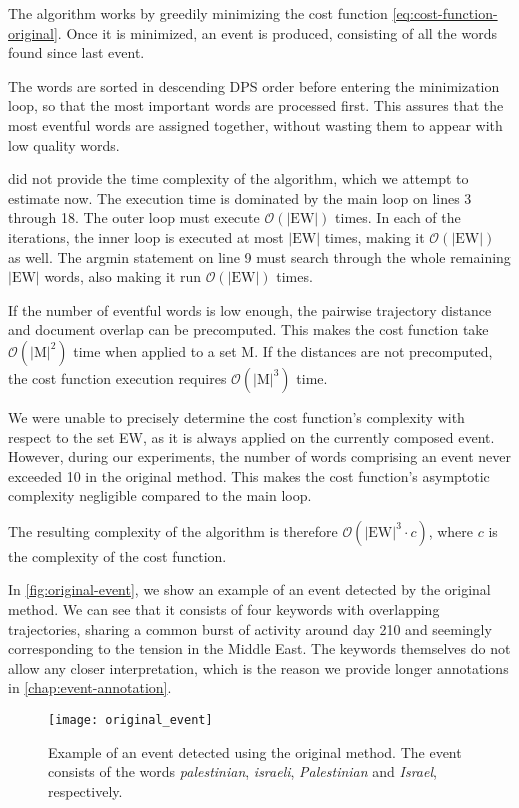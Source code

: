 The algorithm works by greedily minimizing the cost function \eqref{eq:cost-function-original}. Once it is minimized, an event is produced, consisting of all the words found since last event.

The words are sorted in descending DPS order before entering the minimization loop, so that the most important words are processed first. This assures that the most eventful words are assigned together, without wasting them to appear with low quality words.

\cite{event-detection} did not provide the time complexity of the algorithm, which we attempt to estimate now. The execution time is dominated by the main loop on lines 3 through 18. The outer loop must execute $\mathcal{O}(|\text{EW}|)$ times. In each of the iterations, the inner loop is executed at most $|\text{EW}|$ times, making it $\mathcal{O}(|\text{EW}|)$ as well. The argmin statement on line 9 must search through the whole remaining $|\text{EW}|$ words, also making it run $\mathcal{O}(|\text{EW}|)$ times.

If the number of eventful words is low enough, the pairwise trajectory distance and document overlap can be precomputed. This makes the cost function take $\mathcal{O}(|\text{M}|^{2})$ time when applied to a set M. If the distances are not precomputed, the cost function execution requires $\mathcal{O}(|\text{M}|^{3})$ time.

We were unable to precisely determine the cost function's complexity with respect to the set EW, as it is always applied on the currently composed event. However, during our experiments, the number of words comprising an event never exceeded 10 in the original method. This makes the cost function's asymptotic complexity negligible compared to the main loop.

The resulting complexity of the algorithm is therefore $\mathcal{O}(|\text{EW}|^{3} \cdot c)$, where $c$ is the complexity of the cost function.


In \autoref{fig:original-event}, we show an example of an event detected by the original method. We can see that it consists of four keywords with overlapping trajectories, sharing a common burst of activity around day 210 and seemingly corresponding to the tension in the Middle East. The keywords themselves do not allow any closer interpretation, which is the reason we provide longer annotations in \autoref{chap:event-annotation}.


\begin{figure}
  \centering
  \texttt{[image: original\_event]}  %
  \caption{Example of an event detected using the original method. The event consists of the words \textit{palestinian}, \textit{israeli}, \textit{Palestinian} and \textit{Israel}, respectively.}
  \label{fig:original-event}
\end{figure}


